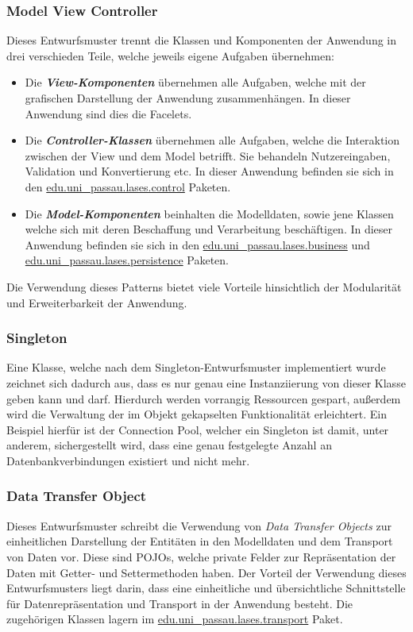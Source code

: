 \subsubsection{Model View Controller}\label{arch:mvc}
Dieses Entwurfsmuster trennt die Klassen und Komponenten der Anwendung in drei
verschieden Teile, welche jeweils eigene Aufgaben übernehmen:
\begin{itemize}
    \item Die \emph{\textbf{View-Komponenten}} übernehmen alle Aufgaben,
    welche mit der grafischen Darstellung der Anwendung zusammenhängen.
    In dieser Anwendung sind dies die Facelets. %
    \item Die \emph{\textbf{Controller-Klassen}} übernehmen alle Aufgaben,
    welche die Interaktion zwischen der View und dem Model betrifft. Sie behandeln
    Nutzereingaben, Validation und Konvertierung etc. In dieser Anwendung befinden sie
    sich in den \hyperref[arch:control]{edu.uni\_passau.lases.control} Paketen.
    \item Die \emph{\textbf{Model-Komponenten}} beinhalten die Modelldaten, sowie jene
    Klassen welche sich mit deren Beschaffung und Verarbeitung beschäftigen. In dieser
    Anwendung befinden sie sich in den \hyperref[arch:business]{edu.uni\_passau.lases.business}
    und \hyperref[arch:persistence]{edu.uni\_passau.lases.persistence} Paketen.
\end{itemize}
Die Verwendung dieses Patterns bietet viele Vorteile hinsichtlich der Modularität
und Erweiterbarkeit der Anwendung.

\subsubsection{Singleton}
Eine Klasse, welche nach dem Singleton-Entwurfsmuster implementiert wurde zeichnet
sich dadurch aus, dass es nur genau eine Instanziierung von dieser Klasse geben
kann und darf. Hierdurch werden vorrangig Ressourcen gespart, außerdem wird die
Verwaltung der im Objekt gekapselten Funktionalität erleichtert.
Ein Beispiel hierfür ist der Connection Pool, %
welcher ein Singleton ist damit, unter anderem, sichergestellt wird, dass
eine genau festgelegte Anzahl an Datenbankverbindungen existiert und nicht mehr.

\subsubsection{Data Transfer Object}
Dieses Entwurfsmuster schreibt die Verwendung von \emph{Data Transfer Objects}
zur einheitlichen Darstellung der Entitäten in den Modelldaten und dem Transport
von Daten vor.
Diese sind POJOs, welche private Felder zur Repräsentation der Daten mit Getter- und
Settermethoden haben.
Der Vorteil der Verwendung dieses Entwurfsmusters liegt darin, dass eine
einheitliche und übersichtliche Schnittstelle für Datenrepräsentation und Transport
in der Anwendung besteht. Die zugehörigen Klassen lagern im
\hyperref[arch:transport]{edu.uni\_passau.lases.transport} Paket.

